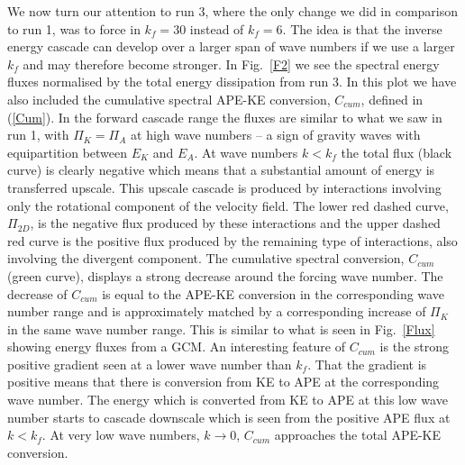 We now turn our attention to run 3, where the only change we did in comparison to run 1, was to force in $ k_f = 30 $ instead of $ k_f = 6 $. The idea is that the inverse energy cascade can develop over a larger span of wave numbers if we use a larger $ k_f $ and may therefore become stronger.  In Fig.~\ref{F2} we see the spectral energy fluxes normalised by the total energy dissipation from run 3.  In this plot we have also included the cumulative spectral APE-KE conversion, $ C_{cum} $,  defined in (\ref{Cum}). In the forward  cascade range the fluxes are similar to what we saw in run 1, with $ \Pi_K = \Pi_A $ at high wave numbers --  a sign of gravity waves with equipartition between $ E_K $ and $ E_A $. At wave numbers $ k < k_f $ the total flux (black curve) is clearly negative which means that a substantial amount of energy is transferred upscale. This upscale cascade 
 is produced by interactions involving only the rotational component  of the velocity field. The lower red dashed curve, $ \Pi_{2D} $, is the negative flux produced by these interactions and the upper dashed red curve is the positive flux produced by the remaining type of interactions, also involving the divergent component.  The cumulative spectral conversion, $ C_{cum} $ (green curve), displays a strong decrease around the forcing wave number. The decrease of $ C_{cum} $ is equal to the APE-KE conversion in the corresponding wave number range and is approximately matched by a corresponding increase of $ \Pi_K $ in the same wave number range. This is similar to what is seen in Fig.~\ref{Flux} showing energy fluxes from a GCM. An interesting feature of $ C_{cum} $ is the strong positive gradient seen at a lower wave number than $ k_f $. That the gradient is positive means that there is conversion from KE to APE at the corresponding wave number. The energy which is converted  from KE to APE at this low wave number starts to cascade downscale which is seen from the positive APE flux at  $ k < k_f $.  At very low wave numbers, $ k \rightarrow 0 $, $ C_{cum} $ approaches the total APE-KE conversion.  
 


